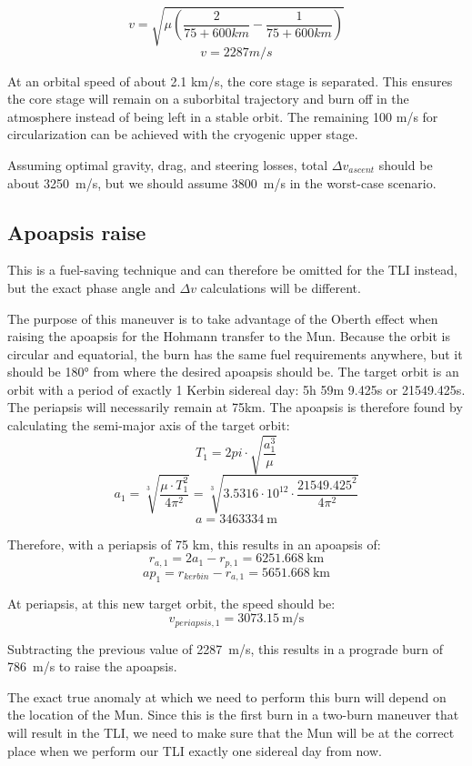 \documentclass[11pt, a4paper]{article}
\begin{document}
\[v = \sqrt{\mu \left(\frac{2}{75 + 600 km} - \frac{1}{75 + 600 km}
    \right)}\]
\[v = 2287 m/s\]

At an orbital speed of about 2.1 km/s, the core stage is separated. This
ensures the core stage will remain on a suborbital trajectory and burn
off in the atmosphere instead of being left in a stable orbit. The
remaining 100 m/s for circularization can be achieved with the
cryogenic upper stage.

Assuming optimal gravity, drag, and steering losses, total
$\Delta v_{ascent}$ should be about \qty{3250}{\metre/\second}, but we should
assume \qty{3800}{\metre/\second} in the worst-case scenario.

\subsection{Apoapsis raise}

This is a fuel-saving technique and can therefore be omitted for the
TLI instead, but the exact phase angle and $\Delta v$ calculations
will be different.

The purpose of this maneuver is to take advantage of the Oberth effect
when raising the apoapsis for the Hohmann transfer to the Mun. Because
the orbit is circular and equatorial, the burn has the same fuel
requirements anywhere, but it should be \ang{180} from where the
desired apoapsis should be. The target orbit is an orbit with a period
of exactly 1 Kerbin sidereal day: 5h 59m 9.425s or 21549.425s.
The periapsis will necessarily remain at 75km. The apoapsis is
therefore found by calculating the semi-major axis of the target
orbit:
\[ T_1 = 2pi \cdot \sqrt{\frac{a_1^3}{\mu}} \]
\[ a_1 = \sqrt[3]{\frac{\mu \cdot T_1^2}{4\pi^2}} = \sqrt[3]{3.5316 \cdot 10^{12} \cdot \frac{21549.425^2}{4\pi^2}}\]
\[ a = \qty{3463334}{\metre}\]

Therefore, with a periapsis of 75 km, this results in an apoapsis of:
\[ r_{a,1} = 2a_1 - r_{p,1} = \qty{6251.668}{\km} \]
\[ ap_1 = r_{kerbin} - r_{a,1} = \qty{5651.668}{\km} \]

At periapsis, at this new target orbit, the speed should be:
\[ v_{periapsis,1} = \qty{3073.15}{\metre/\second}\]

Subtracting the previous value of \qty{2287}{\metre/\second},
this results in a prograde burn of \qty{786}{\metre/\second} to raise
the apoapsis.

The exact true anomaly at which we need to perform this burn will
depend on the location of the Mun. Since this is the first burn in a
two-burn maneuver that will result in the TLI, we need to make sure
that the Mun will be at the correct place when we perform our TLI
exactly one sidereal day from now.
\end{document}
